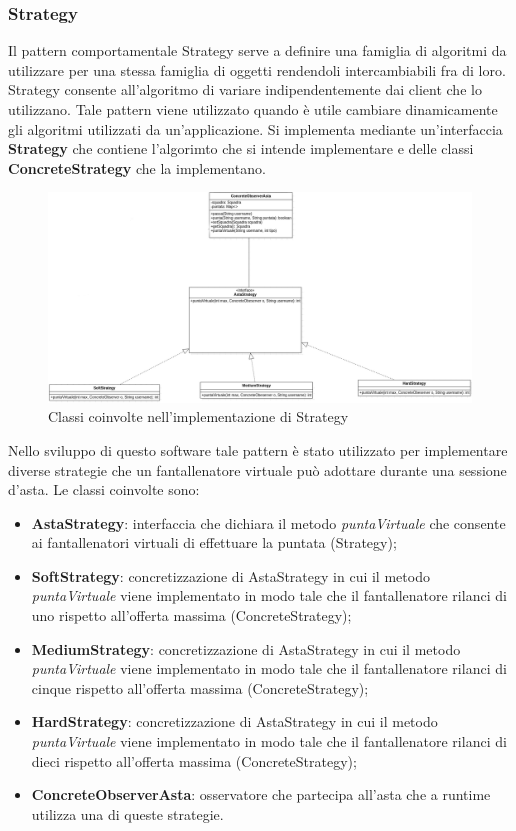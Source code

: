 \documentclass[12pt,a4paper]{article}
\begin{document}
\subsubsection{Strategy}
Il pattern comportamentale Strategy serve a definire una famiglia di algoritmi da utilizzare per una stessa famiglia di oggetti rendendoli intercambiabili fra di loro. Strategy consente all'algoritmo di variare indipendentemente dai client che lo utilizzano. Tale pattern viene utilizzato quando è utile cambiare dinamicamente  gli algoritmi utilizzati da un'applicazione. Si implementa mediante un'interfaccia \textbf{Strategy} che contiene l'algorimto che si intende implementare e delle classi \textbf{ConcreteStrategy} che la implementano.
\begin{figure}[h]
\centering
\includegraphics[width=18 cm ,keepaspectratio]{Strategy.png}
\caption{Classi coinvolte nell'implementazione di Strategy}
\end{figure}
\newline
Nello sviluppo di questo software tale pattern è stato utilizzato per implementare diverse strategie che un fantallenatore virtuale può adottare durante una sessione d'asta. Le classi coinvolte sono:
\begin{itemize}
\item \textbf{AstaStrategy}: interfaccia che dichiara il metodo \textit{puntaVirtuale} che consente ai fantallenatori virtuali di effettuare la puntata (Strategy);
\item \textbf{SoftStrategy}: concretizzazione di AstaStrategy in cui il metodo \textit{puntaVirtuale} viene implementato in modo tale che il fantallenatore rilanci di uno rispetto all'offerta massima (ConcreteStrategy);
\item \textbf{MediumStrategy}: concretizzazione di AstaStrategy in cui il metodo \textit{puntaVirtuale} viene implementato in modo tale che il fantallenatore rilanci di cinque rispetto all'offerta massima (ConcreteStrategy);
\item \textbf{HardStrategy}: concretizzazione di AstaStrategy in cui il metodo \textit{puntaVirtuale} viene implementato in modo tale che il fantallenatore rilanci di dieci rispetto all'offerta massima (ConcreteStrategy);
\item \textbf{ConcreteObserverAsta}: osservatore che partecipa all'asta che a runtime utilizza una di queste strategie.

\end{itemize}
\end{document}
